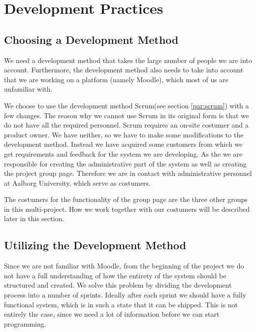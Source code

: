 \section{Development Practices} %

\subsection{Choosing a Development Method}
We need a development method that takes the large number of people we are into account.
Furthermore, the development method also needs to take into account that we are working on a platform (namely Moodle), which most of us are unfamiliar with.

We choose to use the development method Scrum(see section \ref{par:scrum}) with a few changes.
The reason why we cannot use Scrum in its original form is that we do not have all the required personnel. 
Scrum requires an on-site costumer and a product owner.
We have neither, so we have to make some modifications to the development method.
Instead we have acquired some customers from which we get requirements and feedback for the system we are developing.
As the \groupname{} we are responsible for creating the administrative part of the system as well as creating the project group page.
Therefore we are in contact with administrative personnel at Aalborg University, which serve as costumers.

The costumers for the functionality of the group page are the three other groups in this multi-project.
How we work together with our costumers will be described later in this section.

\subsection{Utilizing the Development Method} %
Since we are not familiar with Moodle, from the beginning of the project we do not have a full understanding of how the entirety of the system should be structured and created.
We solve this problem by dividing the development process into a number of sprints.
Ideally after each sprint we should have a fully functional system, which is in such a state that it can be shipped.
This is not entirely the case, since we need a lot of information before we can start programming.

